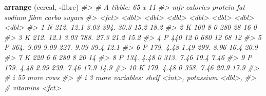 \documentclass[
]{book}
\newenvironment{Shaded}{\begin{snugshade}}{\end{snugshade}}
\newcommand{\CommentTok}[1]{\textcolor[rgb]{0.56,0.35,0.01}{\textit{#1}}}
\newcommand{\FunctionTok}[1]{\textcolor[rgb]{0.13,0.29,0.53}{\textbf{#1}}}
\newcommand{\NormalTok}[1]{#1}
\newcommand{\SpecialCharTok}[1]{\textcolor[rgb]{0.81,0.36,0.00}{\textbf{#1}}}
\begin{document}
\begin{Shaded}
\begin{Highlighting}[]
\FunctionTok{arrange}\NormalTok{ (cereal, }\SpecialCharTok{{-}}\NormalTok{fibre)}
\CommentTok{\#\textgreater{} \# A tibble: 65 x 11}
\CommentTok{\#\textgreater{}    mfr   calories protein   fat sodium fibre carbo sugars}
\CommentTok{\#\textgreater{}    \textless{}fct\textgreater{}    \textless{}dbl\textgreater{}   \textless{}dbl\textgreater{} \textless{}dbl\textgreater{}  \textless{}dbl\textgreater{} \textless{}dbl\textgreater{} \textless{}dbl\textgreater{}  \textless{}dbl\textgreater{}}
\CommentTok{\#\textgreater{}  1 N         212.   12.1   3.03   394. 30.3   15.2  18.2 }
\CommentTok{\#\textgreater{}  2 K         100     8     0      280  28     16     0   }
\CommentTok{\#\textgreater{}  3 K         212.   12.1   3.03   788. 27.3   21.2  15.2 }
\CommentTok{\#\textgreater{}  4 P         440    12     0      680  12     68    12   }
\CommentTok{\#\textgreater{}  5 P         364.    9.09  9.09   227.  9.09  39.4  12.1 }
\CommentTok{\#\textgreater{}  6 P         179.    4.48  1.49   299.  8.96  16.4  20.9 }
\CommentTok{\#\textgreater{}  7 K         220     6     6      280   8     20    14   }
\CommentTok{\#\textgreater{}  8 P         134.    4.48  0      313.  7.46  19.4   7.46}
\CommentTok{\#\textgreater{}  9 P         179.    4.48  2.99   239.  7.46  17.9  14.9 }
\CommentTok{\#\textgreater{} 10 K         179.    4.48  0      358.  7.46  20.9  17.9 }
\CommentTok{\#\textgreater{} \# i 55 more rows}
\CommentTok{\#\textgreater{} \# i 3 more variables: shelf \textless{}int\textgreater{}, potassium \textless{}dbl\textgreater{},}
\CommentTok{\#\textgreater{} \#   vitamins \textless{}fct\textgreater{}}


\end{Highlighting}
\end{Shaded}
\end{document}
